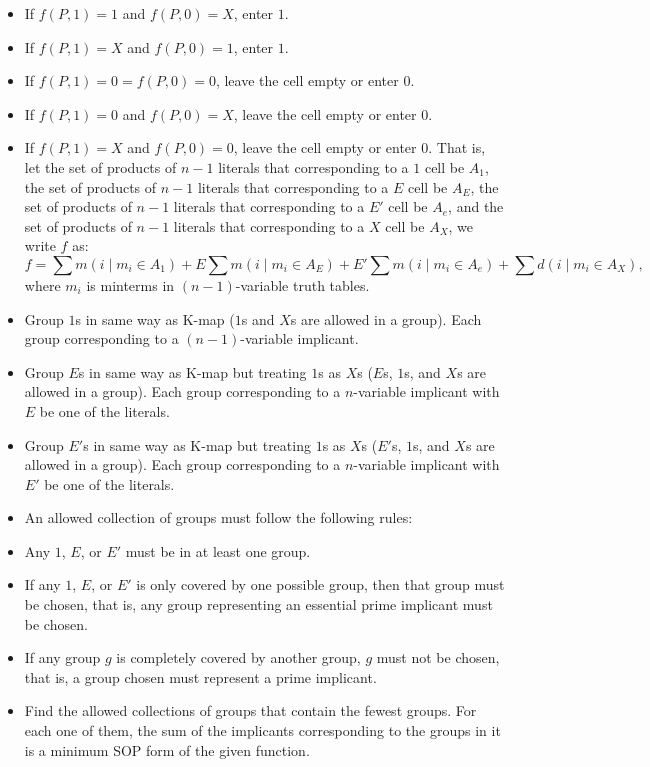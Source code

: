 \documentclass[a4paper,12pt]{article}
\begin{document}
\begin{itemize}
\begin{itemize}
\begin{itemize}
\begin{itemize}
\begin{itemize}
\begin{itemize}
\begin{itemize}
\item If $f(P,1)=1$ and $f(P,0)=X$, enter $1$.
\item If $f(P,1)=X$ and $f(P,0)=1$, enter $1$.
\item If $f(P,1)=0=f(P,0)=0$, leave the cell empty or enter $0$.
\item If $f(P,1)=0$ and $f(P,0)=X$, leave the cell empty or enter $0$.
\item If $f(P,1)=X$ and $f(P,0)=0$, leave the cell empty or enter $0$.
\eit
That is, let the set of products of $n-1$ literals that corresponding to a $1$ cell be $A_1$, the set of products of $n-1$ literals that corresponding to a $E$ cell be $A_E$, the set of products of $n-1$ literals that corresponding to a $E'$ cell be $A_e$, and the set of products of $n-1$ literals that corresponding to a $X$ cell be $A_X$, we write $f$ as:
\[f=\sum m(i\mid m_i\in A_1)+E\sum m(i\mid m_i\in A_E)+E'\sum m(i\mid m_i\in A_e)+\sum d(i\mid m_i\in A_X),\]
where $m_i$ is minterms in $(n-1)$-variable truth tables.
\item Group $1$s in same way as K-map ($1$s and $X$s are allowed in a group). Each group corresponding to a $(n-1)$-variable implicant.
\item Group $E$s in same way as K-map but treating $1$s as $X$s ($E$s, $1$s, and $X$s are allowed in a group). Each group corresponding to a $n$-variable implicant with $E$ be one of the literals.
\item Group $E'$s in same way as K-map but treating $1$s as $X$s ($E'$s, $1$s, and $X$s are allowed in a group). Each group corresponding to a $n$-variable implicant with $E'$ be one of the literals.
\item An allowed collection of groups must follow the following rules:
\bit
\item Any $1$, $E$, or $E'$ must be in at least one group.
\item If any $1$, $E$, or $E'$ is only covered by one possible group, then that group must be chosen, that is, any group representing an essential prime implicant must be chosen.
\item If any group $g$ is completely covered by another group, $g$ must not be chosen, that is, a group chosen must represent a prime implicant.
\eit
\item Find the allowed collections of groups that contain the fewest groups. For each one of them, the sum of the implicants corresponding to the groups in it is a minimum SOP form of the given function.
\een
{}

\end{itemize}
\end{itemize}
\end{itemize}
\end{itemize}
\end{itemize}
\end{itemize}
\end{itemize}
\end{document}
